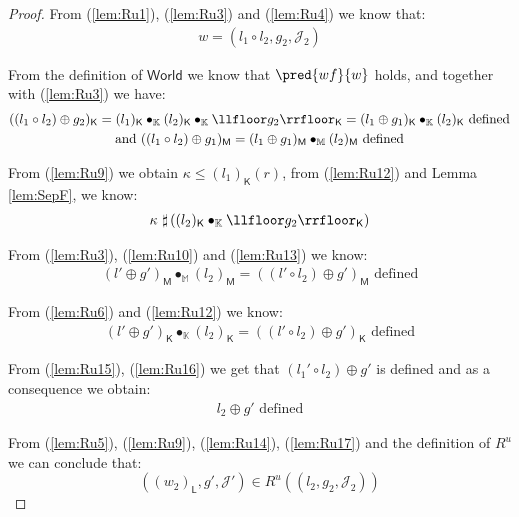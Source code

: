 {\begin{proof}
From (\ref{lem:Ru1}), (\ref{lem:Ru3}) and (\ref{lem:Ru4}) we know that:
\begin{gather}
	\label{lem:Ru11} w = (l_1 \circ l_2, g_2, \mathcal{J}_2)
\end{gather}

From the definition of $\mathsf{World}$ we know that $\pred{wf}{w}$ holds, and together with (\ref{lem:Ru3}) we have:
\begin{gather}
	\label{lem:Ru12} ((l_1 \circ l_2) \oplus g_2)_\mathsf{K} = (l_1)_\mathsf{K} \bullet_\mathbb{K} (l_2)_\mathsf{K} \bullet_\mathbb{K} \llfloor g_2 \rrfloor_\mathsf{K} = (l_1 \oplus g_1)_\mathsf{K} \bullet_\mathbb{K} (l_2)_\mathsf{K} \text{ defined}
	\\
	\label{lem:Ru13} \text{and } ((l_1 \circ l_2) \oplus g_1)_\mathsf{M} = (l_1 \oplus g_1)_\mathsf{M} \bullet_\mathbb{M} (l_2)_\mathsf{M} \text{ defined}
\end{gather}

From (\ref{lem:Ru9}) we obtain $\kappa \leq (l_1)_\mathsf{K}(r)$, from (\ref{lem:Ru12}) and Lemma \ref{lem:SepF}, we know:
\begin{gather}
	\label{lem:Ru14} \kappa\ \sharp \left( (l_2)_\mathsf{K} \bullet_\mathbb{K} \llfloor g_2 \rrfloor_\mathsf{K} \right)
\end{gather}

From (\ref{lem:Ru3}), (\ref{lem:Ru10}) and (\ref{lem:Ru13}) we know:
\begin{gather}
	\label{lem:Ru15} (l' \oplus g')_\mathsf{M} \bullet_\mathbb{M} (l_2)_\mathsf{M} = ((l' \circ l_2) \oplus g')_\mathsf{M} \text{ defined}
\end{gather}

From (\ref{lem:Ru6}) and (\ref{lem:Ru12}) we know:
\begin{gather}
	\label{lem:Ru16} (l' \oplus g')_\mathsf{K} \bullet_\mathbb{K} (l_2)_\mathsf{K} = ((l' \circ l_2) \oplus g')_\mathsf{K} \text{ defined}
\end{gather}

From (\ref{lem:Ru15}), (\ref{lem:Ru16}) we get that $(l_1' \circ l_2) \oplus g'$ is defined and as a consequence we obtain:
\begin{gather}
	\label{lem:Ru17} l_2 \oplus g' \text{ defined}
\end{gather}

From (\ref{lem:Ru5}), (\ref{lem:Ru9}), (\ref{lem:Ru14}), (\ref{lem:Ru17}) and the definition of $R^u$ we can conclude that:
\[
	((w_2)_\mathsf{L}, g', \mathcal{J}') \in R^u((l_2, g_2, \mathcal{J}_2))
\]
\end{proof}
}

